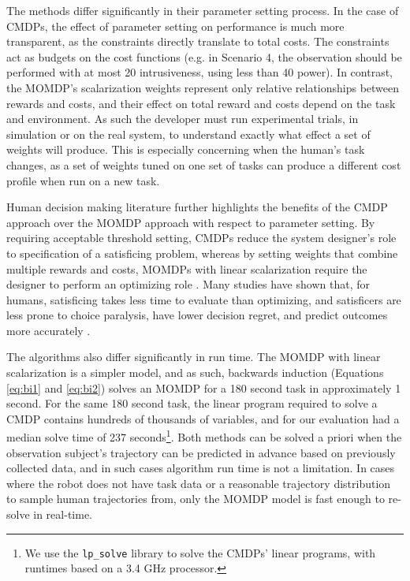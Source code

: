\documentclass[letterpaper, 10 pt, conference]{ieeeconf}  %
\begin{document}
The methods differ significantly in their parameter setting process.  In the case of CMDPs, the effect of parameter setting on performance is much more transparent, as the constraints directly translate to total costs.  The constraints act as budgets on the cost functions (e.g. in Scenario 4, the observation should be performed with at most 20 intrusiveness, using less than 40 power).  In contrast, the MOMDP's scalarization weights represent only relative relationships between rewards and costs, and their effect on total reward and costs depend on the task and environment.  As such the developer must run experimental trials, in simulation or on the real system, to understand exactly what effect a set of weights will produce.  This is especially concerning when the human's task changes, as a set of weights tuned on one set of tasks can produce a different cost profile when run on a new task.

Human decision making literature further highlights the benefits of the CMDP approach over the MOMDP approach with respect to parameter setting.  By requiring acceptable threshold setting, CMDPs reduce the system designer's role to specification of a satisficing problem, whereas by setting weights that combine multiple rewards and costs, MOMDPs with linear scalarization require the designer to perform an optimizing role \cite{eilon1972goals}.  Many studies have shown that, for humans, satisficing takes less time to evaluate than optimizing, and satisficers are less prone to choice paralysis, have lower decision regret, and predict outcomes more accurately \cite{schwartz2002maximizing, parker2007maximizers, jain2013maximizers}.

The algorithms also differ significantly in run time.  The MOMDP with linear scalarization is a simpler model, and as such, backwards induction (Equations \ref{eq:bi1} and \ref{eq:bi2}) solves an MOMDP for a 180 second task in approximately 1 second.  For the same 180 second task, the linear program required to solve a CMDP contains hundreds of thousands of variables, and for our evaluation had a median solve time of 237 seconds\footnote{We use the \texttt{lp\_solve} library to solve the CMDPs' linear programs, with runtimes based on a 3.4 GHz processor.}.  Both methods can be solved a priori when the observation subject's trajectory can be predicted in advance based on previously collected data, and in such cases algorithm run time is not a limitation.  In cases where the robot does not have task data or a reasonable trajectory distribution to sample human trajectories from, only the MOMDP model is fast enough to re-solve in real-time.
\end{document}
